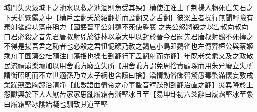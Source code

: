 城門失火汲城下之池水以救之池涸則魚受其殃】横使江淮士子荆揚人物死亡矢石之下夭折霧露之中【横戶孟翻夭於紹翻折而設翻又之舌翻】彼梁主者操行無聞輕險有素射雀論功蕩舟稱力【國語晉平公射鷃不死使䜿襄之失公怒將殺之以告叔向叔向曰君必殺之昔先君唐叔射兕於徒林以為大甲以封於晉今君嗣先君唐叔射鷃不死摶之不得是揚吾君之恥者也必殺之君忸怩顔乃赦之鷃扈小鳥即鷃雀也左傳齊桓公與蔡姬乘舟于囿蕩公杜預注曰蕩揺也操七到翻行下孟翻射而亦翻】年既老矣耄又及之政散民流禮崩樂壞加以用舍乖方廢立失所【用舍乖方謂免周捨責顧琛而用朱异廢立失所謂衘昭明而不立世適孫乃立太子綱也舍讀曰捨】矯情動俗飾智驚愚毒螫滿懷妄敦戒業躁競盈胸謬治清净【此數語曲盡帝之心事螫音釋躁則到翻治直之翻】災異降於上怨讟興於下人人厭苦家家思亂履霜有漸堅冰且至【易坤卦初六爻辭曰履霜堅冰至象曰履霜堅冰隂始凝也馴致其道至堅